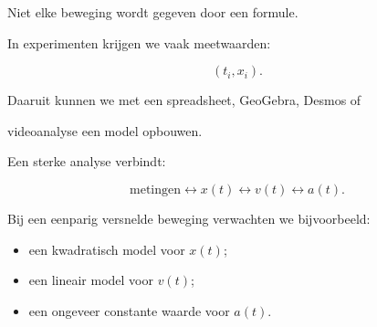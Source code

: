 \documentclass{ximera}
\begin{document}


Niet elke beweging wordt gegeven door een formule.

In experimenten krijgen we vaak meetwaarden:

\[(t_i,x_i).\]

Daaruit kunnen we met een spreadsheet, GeoGebra, Desmos of

videoanalyse een model opbouwen.

Een sterke analyse verbindt:

\[\boxed{ \text{metingen} \longleftrightarrow x(t) \longleftrightarrow v(t) \longleftrightarrow a(t). }\]

Bij een eenparig versnelde beweging verwachten we bijvoorbeeld:

\begin{itemize}

 \item een kwadratisch model voor $x(t)$;

 \item een lineair model voor $v(t)$;

 \item een ongeveer constante waarde voor $a(t)$.

\end{itemize}
\end{document}
